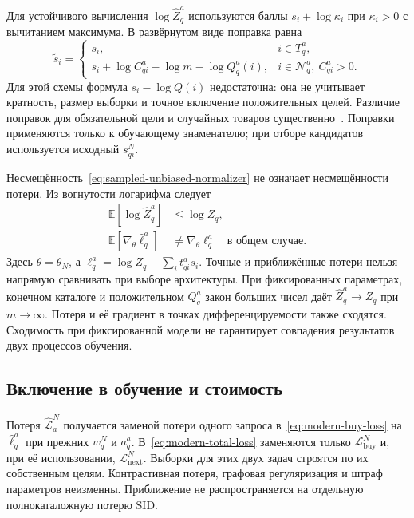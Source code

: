 \documentclass[12pt,a4paper]{article}
\newcommand{\E}{\mathbb E}
\theoremstyle{plainru}
\begin{document}
Для устойчивого вычисления $\log\widehat Z_q^a$ используются баллы
$s_i+\log\kappa_i$ при $\kappa_i>0$ с вычитанием максимума.
В развёрнутом виде поправка равна
\begin{equation}\label{eq:sampled-adjusted-score}
\widetilde s_i=
\begin{cases}
s_i, & i\in T_q^a,\\
s_i+\log C_{qi}^a-\log m-\log Q_q^a(i),
& i\in\mathcal N_q^a,\ C_{qi}^a>0.
\end{cases}
\end{equation}
Для этой схемы формула $s_i-\log Q(i)$ недостаточна: она не учитывает кратность,
размер выборки и точное включение положительных целей. Различие поправок
для обязательной цели и случайных товаров существенно~\cite{logq2025}.
Поправки применяются только к обучающему знаменателю;
при отборе кандидатов используется исходный $s_{qi}^N$.

Несмещённость~\eqref{eq:sampled-unbiased-normalizer}
не означает несмещённости потери. Из вогнутости логарифма следует
\begin{align}\label{eq:sampled-bias}
\E[\log\widehat Z_q^a]&\le\log Z_q,\\
\E[\nabla_\theta\widehat\ell_q^a]
&\ne\nabla_\theta\ell_q^a
\quad\text{в общем случае}.\nonumber
\end{align}
Здесь $\theta=\theta_N$, а
$\ell_q^a=\log Z_q-\sum_i t_{qi}^as_i$.
Точные и приближённые потери нельзя напрямую сравнивать
при выборе архитектуры.
При фиксированных параметрах, конечном каталоге и положительном
$Q_q^a$ закон больших чисел даёт
$\widehat Z_q^a\to Z_q$ при $m\to\infty$.
Потеря и её градиент в точках дифференцируемости также сходятся.
Сходимость при фиксированной модели не гарантирует совпадения
результатов двух процессов обучения.

\subsection{Включение в обучение и стоимость}
\label{sec:sampled-protocol}

Потеря $\widehat{\mathcal L}_a^N$ получается заменой
потери одного запроса в~\eqref{eq:modern-buy-loss}
на $\widehat\ell_q^a$ при прежних $w_q^N$ и $a_q^a$.
В~\eqref{eq:modern-total-loss} заменяются только
$\mathcal L_{\mathrm{buy}}^N$ и, при её использовании,
$\mathcal L_{\mathrm{next}}^N$.
Выборки для этих двух задач строятся по их собственным целям.
Контрастивная потеря, графовая регуляризация и штраф параметров неизменны.
Приближение не распространяется на отдельную полнокаталожную потерю SID.
\end{document}
